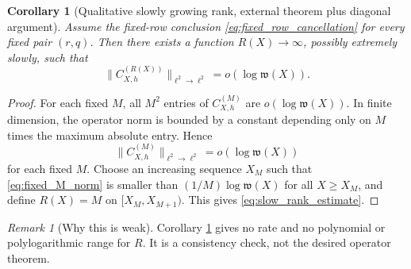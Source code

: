 \documentclass[11pt]{amsart}
\numberwithin{equation}{section}
\theoremstyle{plain}
\newtheorem{corollary}[theorem]{Corollary}
\theoremstyle{definition}
\theoremstyle{remark}
\newtheorem{remark}[theorem]{Remark}
\begin{document}
\begin{corollary}[Qualitative slowly growing rank, external theorem plus diagonal argument]
\label{cor:slow_rank}
Assume the fixed-row conclusion \eqref{eq:fixed_row_cancellation} for every fixed pair \((r,q)\).  Then there exists a function \(R(X)\to\infty\), possibly extremely slowly, such that
\begin{equation}
\|C_{X,h}^{(R(X))}\|_{\ell^2\to\ell^2}=o(\log\mathfrak w(X)).
\label{eq:slow_rank_estimate}
\end{equation}
\end{corollary}

\begin{proof}
For each fixed \(M\), all \(M^2\) entries of \(C_{X,h}^{(M)}\) are \(o(\log\mathfrak w(X))\).  In finite dimension, the operator norm is bounded by a constant depending only on \(M\) times the maximum absolute entry.  Hence
\begin{equation}
\|C_{X,h}^{(M)}\|_{\ell^2\to\ell^2}=o(\log\mathfrak w(X))
\label{eq:fixed_M_norm}
\end{equation}
for each fixed \(M\).  Choose an increasing sequence \(X_M\) such that \eqref{eq:fixed_M_norm} is smaller than \((1/M)\log\mathfrak w(X)\) for all \(X\ge X_M\), and define \(R(X)=M\) on \([X_M,X_{M+1})\).  This gives \eqref{eq:slow_rank_estimate}.
\end{proof}

\begin{remark}[Why this is weak]
\label{rem:slow_rank_weak}
Corollary \ref{cor:slow_rank} gives no rate and no polynomial or polylogarithmic range for \(R\).  It is a consistency check, not the desired operator theorem.
\end{remark}
\end{document}
